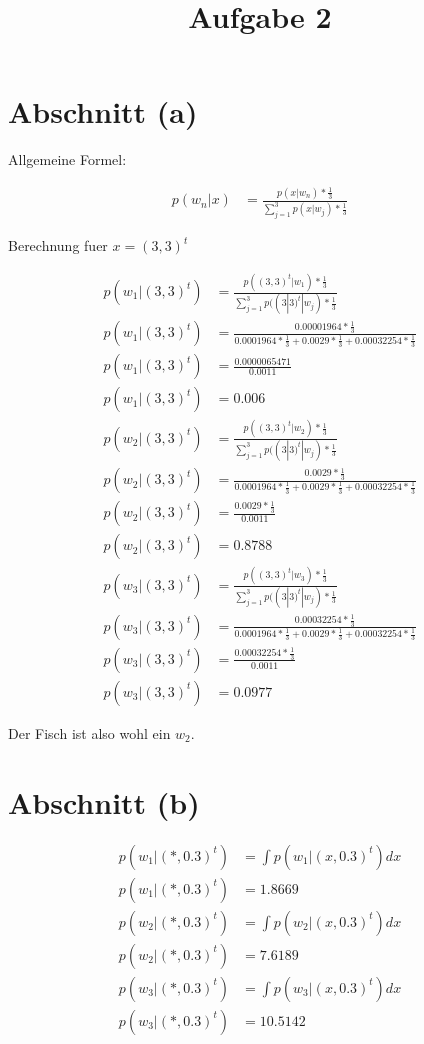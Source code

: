 \documentclass[12pt]{article}
\title{Aufgabe 2}
\date{}
\begin{document}
\section{Abschnitt (a)}

Allgemeine Formel:

  \begin{align}
    p(w_n|x) &= \frac{p(x|w_n) * \frac{1}{3}}{\sum_{j=1}^3 p(x|w_j) * \frac{1}{3}}
  \end{align}
  
Berechnung fuer $x = (3,3)^t$

  \begin{align}
    p(w_1|(3,3)^t) &= \frac{p((3,3)^t|w_1) * \frac{1}{3}}{\sum_{j=1}^3 p((3|3)^t|w_j) * \frac{1}{3}} \\
    p(w_1|(3,3)^t) &= \frac{0.00001964 * \frac{1}{3}}{0.0001964 * \frac{1}{3} + 0.0029 * \frac{1}{3} + 0.00032254 * \frac{1}{3}} \\
    p(w_1|(3,3)^t) &= \frac{0.0000065471}{0.0011} \\
    p(w_1|(3,3)^t) &= 0.006
  \end{align}
  \begin{align}
    p(w_2|(3,3)^t) &= \frac{p((3,3)^t|w_2) * \frac{1}{3}}{\sum_{j=1}^3 p((3|3)^t|w_j) * \frac{1}{3}} \\
    p(w_2|(3,3)^t) &= \frac{0.0029 * \frac{1}{3}}{0.0001964 * \frac{1}{3} + 0.0029 * \frac{1}{3} + 0.00032254 * \frac{1}{3}} \\
    p(w_2|(3,3)^t) &= \frac{0.0029 * \frac{1}{3}}{0.0011} \\
    p(w_2|(3,3)^t) &= 0.8788
  \end{align}
  \begin{align}
    p(w_3|(3,3)^t) &= \frac{p((3,3)^t|w_3) * \frac{1}{3}}{\sum_{j=1}^3 p((3|3)^t|w_j) * \frac{1}{3}} \\
    p(w_3|(3,3)^t) &= \frac{0.00032254 * \frac{1}{3}}{0.0001964 * \frac{1}{3} + 0.0029 * \frac{1}{3} + 0.00032254 * \frac{1}{3}} \\
    p(w_3|(3,3)^t) &= \frac{0.00032254 * \frac{1}{3}}{0.0011} \\
    p(w_3|(3,3)^t) &= 0.0977
  \end{align}

Der Fisch ist also wohl ein $w_2$.

\section{Abschnitt (b)}

  \begin{align}
    p(w_1|(*,0.3)^t) &=\int p(w_1|(x,0.3)^t) dx\\
    p(w_1|(*,0.3)^t) &= 1.8669
  \end{align}
  \begin{align}
    p(w_2|(*,0.3)^t) &=\int p(w_2|(x,0.3)^t) dx\\
    p(w_2|(*,0.3)^t) &= 7.6189
  \end{align}
  \begin{align}
    p(w_3|(*,0.3)^t) &=\int p(w_3|(x,0.3)^t) dx\\
    p(w_3|(*,0.3)^t) &= 10.5142
  \end{align}
\end{document}
